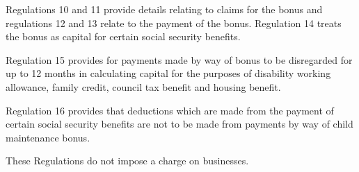 \documentclass[a4paper]{article}
\begin{document}
  Regulations 10 and 11 provide details relating to claims for the bonus and regulations 12 and 13 relate to the payment of the bonus. Regulation 14 treats the bonus as capital for certain social security benefits.

  Regulation 15 provides for payments made by way of bonus to be disregarded for up to 12 months in calculating capital for the purposes of disability working allowance, family credit, council tax benefit and housing benefit.

  Regulation 16 provides that deductions which are made from the payment of certain social security benefits are not to be made from payments by way of child maintenance bonus.

  These Regulations do not impose a charge on businesses.
\end{document}
